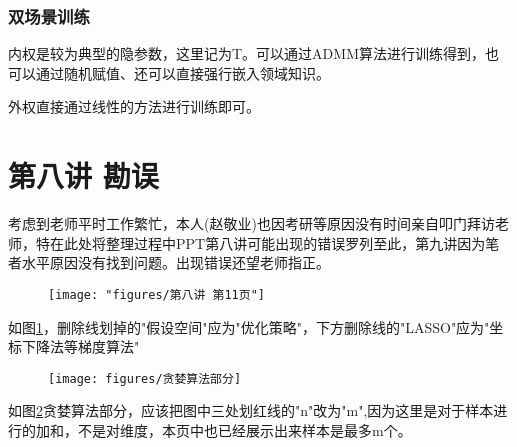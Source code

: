\documentclass[10pt, a4paper]{article}
\begin{document}
\subsubsection{双场景训练}

内权是较为典型的隐参数，这里记为T。可以通过ADMM算法进行训练得到，也可以通过随机赋值、还可以直接强行嵌入领域知识。

外权直接通过线性的方法进行训练即可。

\section{第八讲 勘误}

考虑到老师平时工作繁忙，本人(赵敬业)也因考研等原因没有时间亲自叩门拜访老师，特在此处将整理过程中PPT第八讲可能出现的错误罗列至此，第九讲因为笔者水平原因没有找到问题。出现错误还望老师指正。
\begin{figure}[tbph!]
	\centering
	\texttt{[image: "figures/第八讲 第11页"]}
	\caption[第八讲 第11页]{}
	\label{fig:11页}
\end{figure}

如图\ref{fig:11页}，删除线划掉的"假设空间"应为"优化策略"，下方删除线的"LASSO"应为"坐标下降法等梯度算法"

\begin{figure}[tbph!]
	\centering
	\texttt{[image: figures/贪婪算法部分]}
	\caption[第八讲 第16页]{}
	\label{fig:贪婪}
\end{figure}

如图\ref{fig:贪婪}贪婪算法部分，应该把图中三处划红线的"n"改为"m",因为这里是对于样本进行的加和，不是对维度，本页中也已经展示出来样本是最多m个。
\newpage


\end{document}

